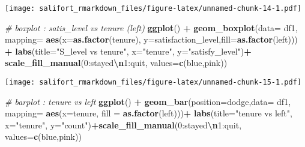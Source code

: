 \documentclass[
]{article}
\newenvironment{Shaded}{\begin{snugshade}}{\end{snugshade}}
\newcommand{\AttributeTok}[1]{\textcolor[rgb]{0.13,0.29,0.53}{#1}}
\newcommand{\CommentTok}[1]{\textcolor[rgb]{0.56,0.35,0.01}{\textit{#1}}}
\newcommand{\FunctionTok}[1]{\textcolor[rgb]{0.13,0.29,0.53}{\textbf{#1}}}
\newcommand{\NormalTok}[1]{#1}
\newcommand{\SpecialCharTok}[1]{\textcolor[rgb]{0.81,0.36,0.00}{\textbf{#1}}}
\newcommand{\StringTok}[1]{\textcolor[rgb]{0.31,0.60,0.02}{#1}}
\begin{document}
\texttt{[image: salifort\_rmarkdown\_files/figure-latex/unnamed-chunk-14-1.pdf]}

\begin{Shaded}
\begin{Highlighting}[]
\CommentTok{\# boxplot : satis\_level vs tenure (left)}
\FunctionTok{ggplot}\NormalTok{() }\SpecialCharTok{+} \FunctionTok{geom\_boxplot}\NormalTok{(}\AttributeTok{data=}\NormalTok{ df1, }\AttributeTok{mapping=} \FunctionTok{aes}\NormalTok{(}\AttributeTok{x=}\FunctionTok{as.factor}\NormalTok{(tenure), }\AttributeTok{y=}\NormalTok{satisfaction\_level,}\AttributeTok{fill=}\FunctionTok{as.factor}\NormalTok{(left))) }\SpecialCharTok{+}
  \FunctionTok{labs}\NormalTok{(}\AttributeTok{title=}\StringTok{"S\_level vs tenure"}\NormalTok{, }\AttributeTok{x=}\StringTok{"tenure"}\NormalTok{, }\AttributeTok{y=}\StringTok{"satisfy\_level"}\NormalTok{)}\SpecialCharTok{+} \FunctionTok{scale\_fill\_manual}\NormalTok{(}\StringTok{\textquotesingle{}0:stayed}\SpecialCharTok{\textbackslash{}n}\StringTok{1:quit\textquotesingle{}}\NormalTok{, }\AttributeTok{values=}\FunctionTok{c}\NormalTok{(}\StringTok{\textquotesingle{}blue\textquotesingle{}}\NormalTok{,}\StringTok{\textquotesingle{}pink\textquotesingle{}}\NormalTok{))}
\end{Highlighting}
\end{Shaded}

\texttt{[image: salifort\_rmarkdown\_files/figure-latex/unnamed-chunk-15-1.pdf]}

\begin{Shaded}
\begin{Highlighting}[]
\CommentTok{\# barplot : tenure vs left}
\FunctionTok{ggplot}\NormalTok{() }\SpecialCharTok{+} \FunctionTok{geom\_bar}\NormalTok{(}\AttributeTok{position=}\StringTok{\textquotesingle{}dodge\textquotesingle{}}\NormalTok{,}\AttributeTok{data=}\NormalTok{ df1, }\AttributeTok{mapping=} \FunctionTok{aes}\NormalTok{(}\AttributeTok{x=}\NormalTok{tenure, }\AttributeTok{fill =} \FunctionTok{as.factor}\NormalTok{(left)))}\SpecialCharTok{+}
  \FunctionTok{labs}\NormalTok{(}\AttributeTok{title=}\StringTok{"tenure vs left"}\NormalTok{, }\AttributeTok{x=}\StringTok{"tenure"}\NormalTok{, }\AttributeTok{y=}\StringTok{"count"}\NormalTok{)}\SpecialCharTok{+}\FunctionTok{scale\_fill\_manual}\NormalTok{(}\StringTok{\textquotesingle{}0:stayed}\SpecialCharTok{\textbackslash{}n}\StringTok{1:quit\textquotesingle{}}\NormalTok{, }\AttributeTok{values=}\FunctionTok{c}\NormalTok{(}\StringTok{\textquotesingle{}blue\textquotesingle{}}\NormalTok{,}\StringTok{\textquotesingle{}pink\textquotesingle{}}\NormalTok{))}
\end{Highlighting}
\end{Shaded}
\end{document}
